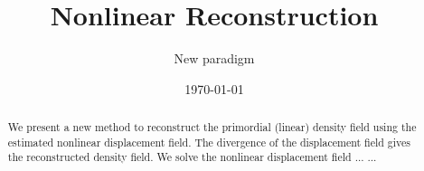 \documentclass[aps,prd,twocolumn,showpacs,superscriptaddress,groupedaddress,nofootinbib]{revtex4}  %
\begin{document}
\widetext

\title{Nonlinear Reconstruction}

\author{New paradigm}






\date{\today}

\begin{abstract}
We present a new method to reconstruct the primordial (linear) density field
using the estimated nonlinear displacement field. The divergence of 
the displacement field gives the reconstructed density field. We solve the 
nonlinear displacement field ... ... 
\end{abstract}
\end{document}
